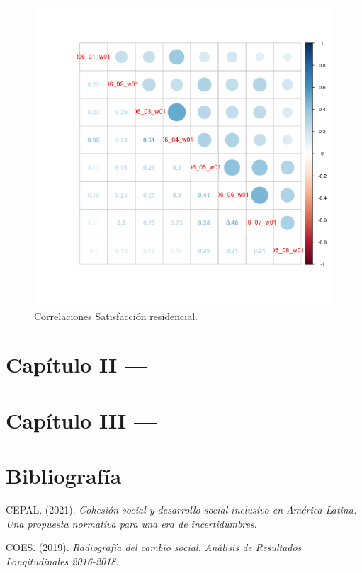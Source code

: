 \documentclass[
  12pt,
]{book}
\newlength{\cslhangindent}
\newenvironment{cslreferences}%
  {\setlength{\parindent}{0pt}%
  \everypar{\setlength{\hangindent}{\cslhangindent}}\ignorespaces}%
  {\par}
\begin{document}
\begin{figure}[H]

{\centering \includegraphics[width=1\linewidth,height=1\textheight]{output/graphs/satisfaccion-residencial_cor} 

}

\caption{Correlaciones Satisfacción residencial.}\label{fig:unnamed-chunk-9}
\end{figure}

\hypertarget{capuxedtulo-ii}{%
\chapter{Capítulo II ---}\label{capuxedtulo-ii}}

\hypertarget{capuxedtulo-iii}{%
\chapter{Capítulo III ---}\label{capuxedtulo-iii}}

\hypertarget{bibliografuxeda}{%
\chapter*{Bibliografía}\label{bibliografuxeda}}

\hypertarget{refs}{}
\begin{cslreferences}
\leavevmode\hypertarget{ref-cepal_Cohesion_2021}{}%
CEPAL. (2021). \emph{Cohesión social y desarrollo social inclusivo en América Latina. Una propuesta normativa para una era de incertidumbres}.

\leavevmode\hypertarget{ref-coes_Radiografia_2019}{}%
COES. (2019). \emph{Radiografía del cambio social. Análisis de Resultados Longitudinales 2016-2018}.
\end{cslreferences}
\end{document}
